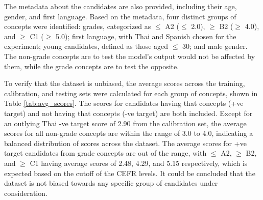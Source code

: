 The metadata about the candidates are also provided, including their age, gender, and first language. Based on the metadata, four distinct groups of concepts were identified: grades, categorized as $\leq$ A2 ($\leq$ 2.0), $\geq$ B2 ($\geq$ 4.0), and $\geq$ C1 ($\geq$ 5.0); first language, with Thai and Spanish chosen for the experiment; young candidates, defined as those aged $\leq$ 30; and male gender. The non-grade concepts are to test the model's output would not be affected by them, while the grade concepts are to test the opposite.

To verify that the dataset is unbiased, the average scores across the training, calibration, and testing sets were calculated for each group of concepts, shown in Table \ref{tab:avg_scores}. The scores for candidates having that concepts (+ve target) and not having that concepts (-ve target) are both included. Except for an outlying Thai -ve target score of 2.90 from the calibration set, the average scores for all non-grade concepts are within the range of 3.0 to 4.0, indicating a balanced distribution of scores across the dataset. The average scores for +ve target candidates from grade concepts are out of the range, with $\leq$ A2, $\geq$ B2, and $\geq$ C1 having average scores of 2.48, 4.29, and 5.15 respectively, which is expected based on the cutoff of the CEFR levels. It could be concluded that the dataset is not biased towards any specific group of candidates under consideration.

